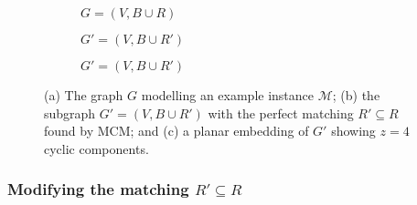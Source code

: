\documentclass[a4paper,11pt,authoryear]{elsarticle}
\begin{document}

\begin{figure}[h!]	
	\centering
	\begin{subfigure}[b]{0.33\textwidth}
		
		\caption{$G = (V, B \cup R)$}
		\label{fig:threshold3}
	\end{subfigure} \hspace{5mm}
	\begin{subfigure}[b]{0.33\textwidth}
		
		\caption{$G' = (V, B \cup R')$}
		\label{fig:matching}
	\end{subfigure} \hspace{6mm}
	\begin{subfigure}[b]{0.2\textwidth}
		
		\caption{$G' = (V, B \cup R')$}
		\label{fig:mps}
	\end{subfigure}
	\caption{(a) The graph $G$ modelling an example instance $\mathcal{M}$; (b) the subgraph $G'=(V, B \cup R')$ with the perfect matching $R' \subseteq R$ found by MCM; and (c) a planar embedding of $G'$ showing $z = 4$ cyclic components.}
	\label{fig:mcm}
\end{figure}


\subsubsection{Modifying the matching $R' \subseteq R$}
\label{subsub:bcr}
\end{document}
